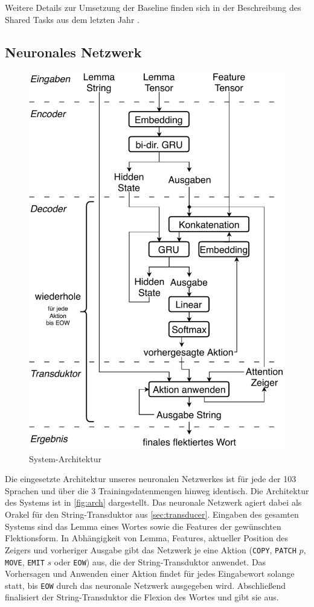 \documentclass[11pt,a4paper]{article}
\newcommand{\action}[1]{\texttt{#1}}
\begin{document}
Weitere Details zur Umsetzung der Baseline finden sich in der Beschreibung des Shared Tasks aus dem letzten Jahr \citep{sigmorphon:st2017}.

\subsection{Neuronales Netzwerk}
\begin{figure}
\centering
\includegraphics[width=\linewidth]{architecture_de}
\caption{System-Architektur}
\label{fig:arch}
\end{figure}
Die eingesetzte Architektur unseres neuronalen Netzwerkes ist für jede der 103 Sprachen und über die 3 Trainingsdatenmengen hinweg identisch.
Die Architektur des Systems ist in \autoref{fig:arch} dargestellt. Das neuronale Netzwerk agiert dabei als Orakel für den String-Transduktor aus \autoref{sec:transducer}.
Eingaben des gesamten Systems sind das Lemma eines Wortes sowie die Features der gewünschten Flektionsform.
In Abhängigkeit von Lemma, Features, aktueller Position des Zeigers und vorheriger Ausgabe gibt das Netzwerk je eine Aktion (\action{COPY}, \action{PATCH} $p$, \action{MOVE}, \action{EMIT} $s$ oder \action{EOW}) aus, die der String-Transduktor anwendet.
Das Vorhersagen und Anwenden einer Aktion findet für jedes Eingabewort solange statt, bis \action{EOW} durch das neuronale Netzwerk ausgegeben wird. Abschließend finalisiert der String-Transduktor die Flexion des Wortes und gibt sie aus.
\end{document}
